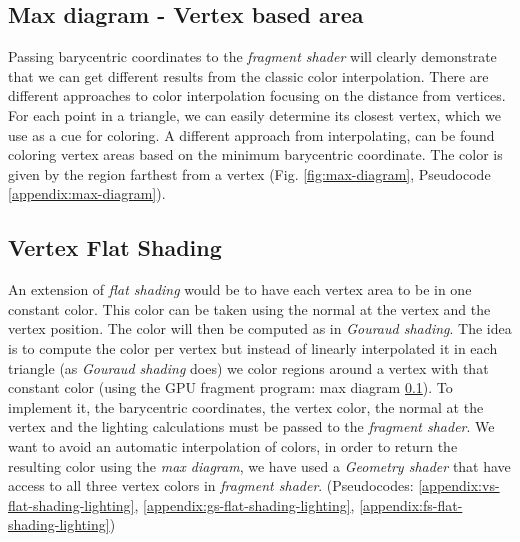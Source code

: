 
\subsection{Max diagram - Vertex based area} \label{section:max-diagram}
Passing barycentric coordinates to the \textit{fragment shader} will clearly demonstrate that we can get different results from the classic color interpolation.\cite{WEBSITE:redbloggames}
There are different approaches to color interpolation focusing on the distance from vertices. For each point in a triangle, we can easily determine its closest vertex, which we use as a cue for coloring.
A different approach from interpolating, can be found coloring vertex areas based on the minimum barycentric coordinate.
The color is given by the region farthest from a vertex (Fig. \ref{fig:max-diagram}, Pseudocode \ref{appendix:max-diagram}).


\subsection{Vertex Flat Shading} \label{section:extend-flat-shading-lighting}
An extension of \textit{flat shading} would be to have each vertex area to be in one constant color. This color can be taken using the normal at the vertex and the vertex position.
The color will then be computed as in \textit{Gouraud shading}.
The idea is to compute the color per vertex but instead of linearly interpolated it in each triangle (as \textit{Gouraud shading} does) we color regions around a vertex with that constant color (using the GPU fragment program: max diagram \ref{section:max-diagram}).
To implement it, the barycentric coordinates, the vertex color, the normal at the vertex and the lighting calculations must be passed to the \textit{fragment shader}.
We want to avoid an automatic interpolation of colors, in order to return the resulting color using the \textit{max diagram}, we have used a \textit{Geometry shader} that have access to all three vertex colors in \textit{fragment shader}. (Pseudocodes: \ref{appendix:vs-flat-shading-lighting}, \ref{appendix:gs-flat-shading-lighting}, \ref{appendix:fs-flat-shading-lighting})

